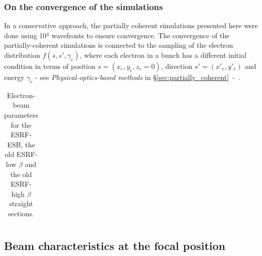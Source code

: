 \begin{refsection}
\subsubsection*{On the convergence of the simulations}
In a conservative approach, the partially coherent simulations presented here were done using 10$^{4}$ wavefronts to ensure convergence.
The convergence of the partially-coherent simulations is connected to the sampling of the electron distribution $f(s,s',\gamma_e)$, where each electron in a bunch has a different initial condition in terms of position $s=(x_e,y_e,z_e=0)$, direction $s'=(x'_e,y'_e)$ and energy $\gamma_e$ - see \textit{Physical-optics-based methods} in \S\ref{sec:partially_coherent}~-~\textit{}. 

\begin{table}
\caption[Electron-beam parameters for the ESRF-ESB, the old ESRF-low $\beta$ and the old ESRF-high $\beta$ straight sections]{Electron-beam parameters for the ESRF-ESB, the old ESRF-low $\beta$ and the old ESRF-high $\beta$ straight sections.}\label{tab:E_beam_param}
\centering
\begin{tabular}{rccc}

\end{tabular}
\end{table}{}

\subsection{Beam characteristics at the focal position}\label{sec:source_image_sim}


\end{refsection}
